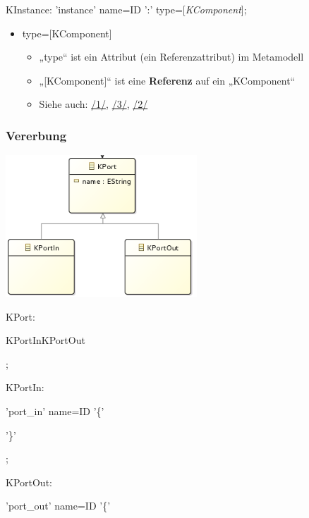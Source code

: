 \documentclass[]{article}
\providecommand{\tightlist}{%
  \setlength{\itemsep}{0pt}\setlength{\parskip}{0pt}}
\begin{document}
KInstance: 'instance' name=ID ':' type={[}\emph{KComponent}{]};

\begin{itemize}
\item
  type={[}KComponent{]}

  \begin{itemize}
  \tightlist
  \item
    „type`` ist ein Attribut (ein Referenzattribut) im Metamodell
  \item
    „{[}KComponent{]}`` ist eine \textbf{Referenz} auf ein „KComponent``
  \item
    Siehe auch: \protect\hyperlink{anchor-1}{/1/},
    \protect\hyperlink{anchor-3}{/3/}, \protect\hyperlink{anchor-2}{/2/}
  \end{itemize}
\end{itemize}

\subsubsection{}\label{section-1}

\subsubsection[Vererbung]{\texorpdfstring{\protect\hypertarget{anchor-25}{}{}Vererbung}{Vererbung}}\label{vererbung}

\includegraphics[width=2.82520in,height=2.09170in]{./Pictures/1000020100000153000000FB3A29A3A8CA4988F4.png}

KPort:

KPortIn\textbar{}KPortOut

;

KPortIn:

'port\_in' name=ID '\{'

'\}'

;

KPortOut:

'port\_out' name=ID '\{'
\end{document}
